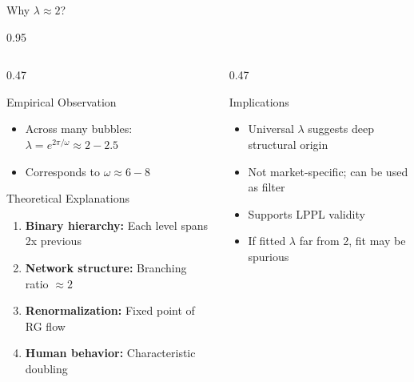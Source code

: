 \documentclass[9pt, aspectratio=169, t]{beamer}
\begin{document}
\begin{frame}{Why $\lambda \approx 2$?}
    \begin{cminipage}{0.95\textwidth}
    {\footnotesize
    \begin{columns}[T]
        \begin{column}{0.47\textwidth}
            \begin{block}{Empirical Observation}
                \begin{itemize}\setlength{\itemsep}{0pt}
                    \item Across many bubbles: $\lambda = e^{2\pi/\omega} \approx 2 - 2.5$
                    \item Corresponds to $\omega \approx 6 - 8$
                \end{itemize}
            \end{block}

            \begin{exampleblock}{Theoretical Explanations}
                \begin{enumerate}\setlength{\itemsep}{1pt}
                    \item \textbf{Binary hierarchy:} Each level spans 2x previous
                    \item \textbf{Network structure:} Branching ratio $\approx 2$
                    \item \textbf{Renormalization:} Fixed point of RG flow
                    \item \textbf{Human behavior:} Characteristic doubling
                \end{enumerate}
            \end{exampleblock}
        \end{column}
        \begin{column}{0.47\textwidth}
            \begin{alertblock}{Implications}
                \begin{itemize}\setlength{\itemsep}{0pt}
                    \item Universal $\lambda$ suggests deep structural origin
                    \item Not market-specific; can be used as filter
                    \item Supports LPPL validity
                    \item If fitted $\lambda$ far from 2, fit may be spurious
                \end{itemize}
            \end{alertblock}


\end{column}
\end{columns}}
\end{cminipage}
\end{frame}
\end{document}
